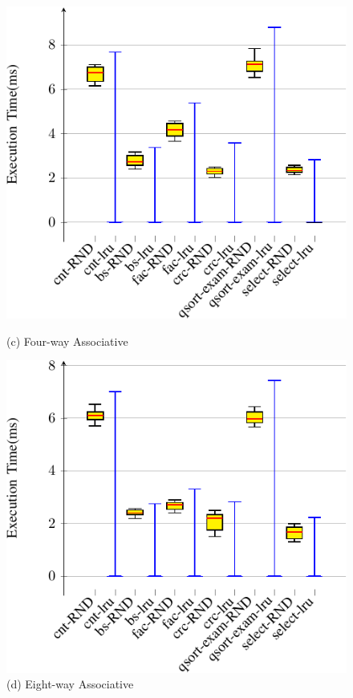 \documentclass{article}
\begin{document}
 \begin{figure}
 \vspace{-3cm}
 \centering
 
 \begin{minipage}{.6\textwidth}
 \hspace{-3cm}
   \centering
   \includegraphics[width=1\linewidth]{four_way.pdf}
  \hspace{-2cm} \caption*{(c) Four-way Associative}
   \label{fig:test1}
 \end{minipage}%
 \begin{minipage}{.6\textwidth}
   \centering
   \includegraphics[width=1\linewidth]{eight_way.pdf}
   \caption*{(d) Eight-way Associative}
   \label{fig:test2}
 \end{minipage}
 \end{figure}
\end{document}
